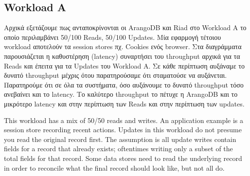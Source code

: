 \documentclass[conference]{IEEEtran}
\begin{document}
\subsection{Workload A}    

Αρχικά εξετάζουμε πως ανταποκρίνονται οι ArangoDB και Riad στο Workload A το οποίο περιλαμβάνει 50/100 Reads, 50/100 Updates.  Μία εφαρμογή τέτοιου workload αποτελούν τα session stores πχ. Cookies ενός browser.  Στα διαγράμματα παρουσιάζεται η καθυστέρηση (latency) συναρτήσει του throughput αρχικά για τα Reads και έπειτα για τα  Updates του Workload A. Σε κάθε περίπτωση αυξάναμε το δυνατό throughput μέχρις ότου παρατηρούσαμε ότι σταματούσε να αυξάνεται. Παρατηρούμε ότι σε όλα τα συστήματα, όσο αυξάνουμε το δυνατό throughput τόσο ανεβαίνει και το latency. Το καλύτερο throughput το πέτυχε η ArangoDB και το μικρότερο latency και στην περίπτωση των Reads και στην περίπτωση των updates. 


This workload has a mix of 50/50 reads and writes. An application example is a session store 
recording recent actions. Updates in this workload do not presume you read the original record first. 
The assumption is all update writes contain fields for a record that already exists; oftentimes writing 
only a subset of the total fields for that record. Some data stores need to read the underlying record 
in order to reconcile what the final record should look like, but not all do.

\end{document}
